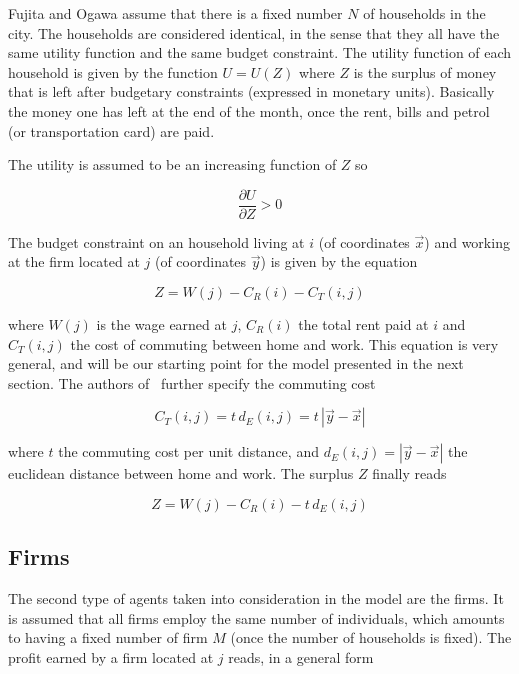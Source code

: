 Fujita and Ogawa assume that there is a fixed number $N$ of households in the
city. The households are considered identical, in the sense that they all have
the same utility function and the same budget constraint. The utility function
of each household is given by the function $U = U(Z)$ where $Z$ is the surplus
of money that is left after budgetary constraints (expressed in monetary units).
Basically the money one has left at the end of the month, once the rent, bills
and petrol (or transportation card) are paid. 

The utility is assumed to be an increasing function of $Z$ so

\begin{equation}
    \frac{\partial U}{\partial Z} > 0
\end{equation}

The budget constraint on an household living at $i$ (of coordinates $\vec{x}$)
and working at the firm located at $j$ (of coordinates $\vec{y}$) is given by the
equation

\begin{equation}
    Z = W\left(j\right)
      - C_R\left(i\right)
      - C_T\left(i,j\right)
\end{equation} 

where $W\left(j\right)$ is the wage earned at $j$, $C_R\left(i\right)$ the total
rent paid at $i$ and $C_T\left(i,j\right)$ the cost of commuting between
home and work. This equation is very general, and will be our starting point for
the model presented in the next section. The authors of~\cite{Fujita:1982}
further specify the commuting cost

\begin{equation}
    C_T\left(i,j\right) = t\,d_E(i,j) = t\,\left|\vec{y}-\vec{x}\left|
\end{equation}

where $t$ the commuting cost per unit distance, and $d_E(i,j) = \left| \vec{y} -
\vec{x} \right|$ the euclidean distance between home and work. The surplus $Z$
finally reads

\begin{equation}
    Z = W\left(j\right)
      - C_R\left(i\right)
      - t\,d_E\left(i,j\right)
\end{equation} 


\subsection{Firms}
\label{sub:firms}

The second type of agents taken into consideration in the model are the firms.
It is assumed that all firms employ the same number of individuals, which
amounts to having a fixed number of firm $M$ (once the number of households is
fixed). The profit earned by a firm  located at $j$ reads, in a general
form

